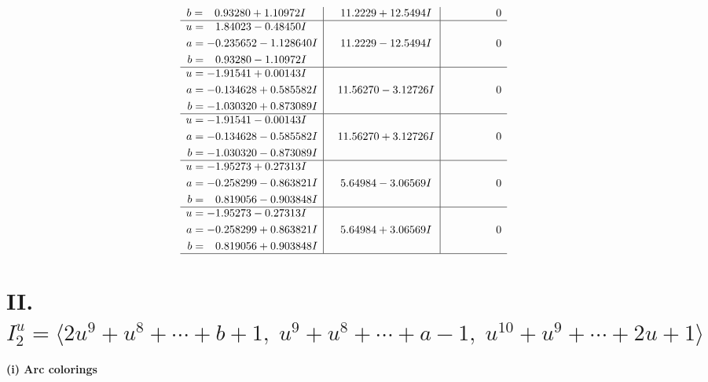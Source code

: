 \documentclass[1p]{elsarticle_modified}
\theoremstyle{definition}
\begin{document}
$$\begin{array}{c|c|c}
\begin{aligned}
b &= \phantom{-}0.93280 + 1.10972 I\end{aligned}
 & \phantom{-}11.2229 + 12.5494 I & \phantom{-0.000000 } 0 \\ \hline\begin{aligned}
u &= \phantom{-}1.84023 - 0.48450 I \\
a &= -0.235652 - 1.128640 I \\
b &= \phantom{-}0.93280 - 1.10972 I\end{aligned}
 & \phantom{-}11.2229 - 12.5494 I & \phantom{-0.000000 } 0 \\ \hline\begin{aligned}
u &= -1.91541 + 0.00143 I \\
a &= -0.134628 + 0.585582 I \\
b &= -1.030320 + 0.873089 I\end{aligned}
 & \phantom{-}11.56270 - 3.12726 I & \phantom{-0.000000 } 0 \\ \hline\begin{aligned}
u &= -1.91541 - 0.00143 I \\
a &= -0.134628 - 0.585582 I \\
b &= -1.030320 - 0.873089 I\end{aligned}
 & \phantom{-}11.56270 + 3.12726 I & \phantom{-0.000000 } 0 \\ \hline\begin{aligned}
u &= -1.95273 + 0.27313 I \\
a &= -0.258299 - 0.863821 I \\
b &= \phantom{-}0.819056 - 0.903848 I\end{aligned}
 & \phantom{-}5.64984 - 3.06569 I & \phantom{-0.000000 } 0 \\ \hline\begin{aligned}
u &= -1.95273 - 0.27313 I \\
a &= -0.258299 + 0.863821 I \\
b &= \phantom{-}0.819056 + 0.903848 I\end{aligned}
 & \phantom{-}5.64984 + 3.06569 I & \phantom{-0.000000 } 0\\
 \hline 
 \end{array}$$\newpage\newpage\renewcommand{\arraystretch}{1}
\centering \section*{II. $I^u_{2}= \langle 2 u^9+u^8+\cdots+b+1,\;u^9+u^8+\cdots+a-1,\;u^{10}+u^9+\cdots+2 u+1 \rangle$}
\flushleft \textbf{(i) Arc colorings}\\
\end{document}

